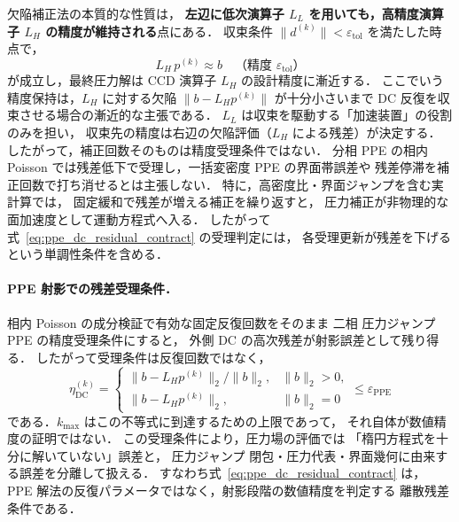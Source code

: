 欠陥補正法の本質的な性質は，
\textbf{左辺に低次演算子 $L_L$ を用いても，高精度演算子 $L_H$ の精度が維持される}点にある．
収束条件 $\|d^{(k)}\| < \varepsilon_\mathrm{tol}$ を満たした時点で，
\begin{equation}
  L_H\,p^{(k)} \approx b
  \quad\text{（精度 $\varepsilon_\mathrm{tol}$）}
\end{equation}
が成立し，最終圧力解は CCD 演算子 $L_H$ の設計精度に漸近する．
ここでいう精度保持は，$L_H$ に対する欠陥 $\|b-L_Hp^{(k)}\|$ が十分小さいまで
DC 反復を収束させる場合の漸近的な主張である．
$L_L$ は収束を駆動する「加速装置」の役割のみを担い，
収束先の精度は右辺の欠陥評価（$L_H$ による残差）が決定する．
したがって，補正回数そのものは精度受理条件ではない．
分相 PPE の相内 Poisson では残差低下で受理し，一括変密度 PPE の界面帯誤差や
残差停滞を補正回数で打ち消せるとは主張しない．
特に，高密度比・界面ジャンプを含む実計算では，
固定緩和で残差が増える補正を繰り返すと，
圧力補正が非物理的な面加速度として運動方程式へ入る．
したがって式~\eqref{eq:ppe_dc_residual_contract} の受理判定には，
各受理更新が残差を下げるという単調性条件を含める．

\paragraph{PPE 射影での残差受理条件．}
相内 Poisson の成分検証で有効な固定反復回数をそのまま
二相 圧力ジャンプ PPE の精度受理条件にすると，
外側 DC の高次残差が射影誤差として残り得る．
したがって受理条件は反復回数ではなく，
\begin{equation}
  \eta_{\mathrm{DC}}^{(k)}
  =
  \begin{cases}
    \|b-L_Hp^{(k)}\|_2/\|b\|_2, & \|b\|_2>0,\\
    \|b-L_Hp^{(k)}\|_2, & \|b\|_2=0
  \end{cases}
  \le \varepsilon_{\mathrm{PPE}}
  \label{eq:ppe_dc_residual_contract}
\end{equation}
である．$k_{\max}$ はこの不等式に到達するための上限であって，
それ自体が数値精度の証明ではない．
この受理条件により，圧力場の評価では
「楕円方程式を十分に解いていない」誤差と，
圧力ジャンプ 閉包・圧力代表・界面幾何に由来する誤差を分離して扱える．
すなわち式~\eqref{eq:ppe_dc_residual_contract} は，
PPE 解法の反復パラメータではなく，射影段階の数値精度を判定する
離散残差条件である．

